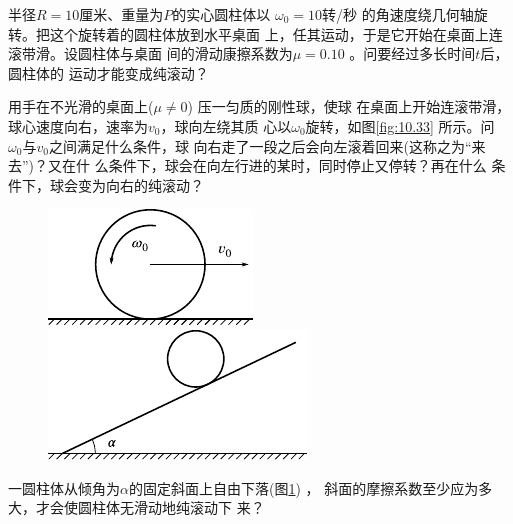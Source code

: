\begin{exercises}
\exercise 半径$  R = 1 0   $厘米、重量为$ P $的实心圆柱体以 $ \omega _ { 0 } = 1 0   $转/秒
的角速度绕几何轴旋转。把这个旋转着的圆柱体放到水平桌面
上，任其运动，于是它开始在桌面上连滚带滑。设圆柱体与桌面
间的滑动康擦系数为$  \mu = 0 . 1 0  $ 。问要经过多长时间$ t $后，圆柱体的
运动才能变成纯滚动？

\exercise 用手在不光滑的桌面上($  \mu \ne 0  $)  压一匀质的刚性球，使球
在桌面上开始连滚带滑，球心速度向右，速率为$  v _ { 0 }   $，球向左绕其质
心以$  \omega _ { 0 }   $旋转，如图\ref{fig:10.33} 所示。问 $ \omega _ { 0 }   $与$  v _ { 0 }   $之间满足什么条件，球
向右走了一段之后会向左滚着回来(这称之为“来去”)？又在什
么条件下，球会在向左行进的某时，同时停止又停转？再在什么
条件下，球会变为向右的纯滚动？

\begin{figure}[h]
    \begin{minipage}{0.4\linewidth}
        \centering
        \includegraphics{figure/fig10.33}
        \caption{}
        \label{fig:10.33}
    \end{minipage}
    \begin{minipage}{0.6\linewidth}
        \centering
        \includegraphics{figure/fig10.34}
        \caption{}
        \label{fig:10.34}
    \end{minipage}
\end{figure}

\exercise 一圆柱体从倾角为$ \alpha $的固定斜面上自由下落(图\ref{fig:10.34}) ，
斜面的摩擦系数至少应为多大，才会使圆柱体无滑动地纯滚动下
来？

\end{exercises}